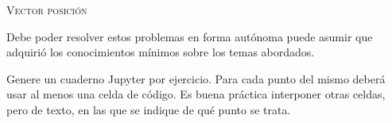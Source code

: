 \documentclass[11pt, a4paper, twoside]{article}
\begin{document}
\begin{center}
	\textsc{\large Vector posición}
\end{center}
Debe poder resolver estos problemas en forma autónoma puede asumir que adquirió los conocimientos mínimos sobre los temas abordados.


\noindent
Genere un cuaderno Jupyter por ejercicio.
Para cada punto del mismo deberá usar al menos una celda de código.
Es buena práctica interponer otras celdas, pero de texto, en las que se indique de qué punto se trata.
 
\begin{enumerate}
	

\end{enumerate}
\end{document}
